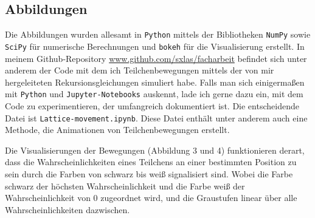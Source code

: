 \documentclass[a4paper,12pt,ngerman]{scrartcl}
\theoremstyle{plain}
\theoremstyle{plain}
\theoremstyle{plain}
\theoremstyle{plain}
\begin{document}
%


\subsection{Abbildungen}
{
Die Abbildungen wurden allesamt in \texttt{Python} mittels der Bibliotheken \texttt{NumPy} sowie \texttt{SciPy} für numerische Berechnungen und \texttt{bokeh} für die Visualisierung erstellt. In meinem Github-Repository \url{www.github.com/sxlas/facharbeit} befindet sich unter anderem der Code mit dem ich Teilchenbewegungen mittels der von mir hergeleiteten Rekursionsgleichungen simuliert habe. Falls man sich einigermaßen mit \texttt{Python} und \texttt{Jupyter-Notebooks} auskennt, lade ich gerne dazu ein, mit dem Code zu experimentieren, der umfangreich dokumentiert ist. Die entscheidende Datei ist \texttt{Lattice-movement.ipynb}. Diese Datei enthält unter anderem auch eine Methode, die Animationen von Teilchenbewegungen erstellt.

Die Visualisierungen der Bewegungen (Abbildung 3 und 4) funktionieren derart, dass die Wahrscheinlichkeiten eines Teilchens an einer bestimmten Position zu sein durch die Farben von schwarz bis weiß signalisiert sind. Wobei die Farbe schwarz der höchsten Wahrscheinlichkeit und die Farbe weiß der Wahrscheinlichkeit von 0 zugeordnet wird, und die Graustufen linear über alle Wahrscheinlichkeiten dazwischen.

}
\end{document}
